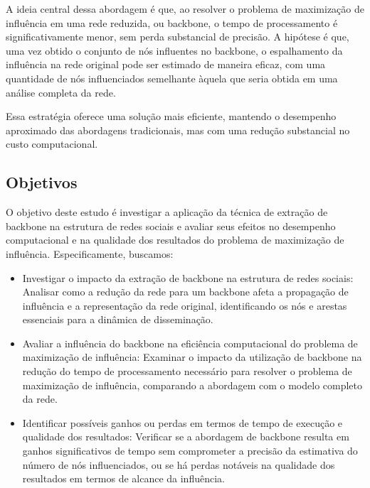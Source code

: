 \documentclass[12pt]{article}
\begin{document}
A ideia central dessa abordagem é que, ao resolver o problema de maximização de influência em uma rede reduzida, ou backbone, o tempo de processamento é significativamente menor, sem perda substancial de precisão. A hipótese é que, uma vez obtido o conjunto de nós influentes no backbone, o espalhamento da influência na rede original pode ser estimado de maneira eficaz, com uma quantidade de nós influenciados semelhante àquela que seria obtida em uma análise completa da rede.

Essa estratégia oferece uma solução mais eficiente, mantendo o desempenho aproximado das abordagens tradicionais, mas com uma redução substancial no custo computacional.

\subsection{Objetivos}

O objetivo deste estudo é investigar a aplicação da técnica de extração de backbone na estrutura de redes sociais e avaliar seus efeitos no desempenho computacional e na qualidade dos resultados do problema de maximização de influência. Especificamente, buscamos:
\begin{itemize}
    \item Investigar o impacto da extração de backbone na estrutura de redes sociais: Analisar como a redução da rede para um backbone afeta a propagação de influência e a representação da rede original, identificando os nós e arestas essenciais para a dinâmica de disseminação.
    \item Avaliar a influência do backbone na eficiência computacional do problema de maximização de influência: Examinar o impacto da utilização de backbone na redução do tempo de processamento necessário para resolver o problema de maximização de influência, comparando a abordagem com o modelo completo da rede.
    \item Identificar possíveis ganhos ou perdas em termos de tempo de execução e qualidade dos resultados: Verificar se a abordagem de backbone resulta em ganhos significativos de tempo sem comprometer a precisão da estimativa do número de nós influenciados, ou se há perdas notáveis na qualidade dos resultados em termos de alcance da influência. 
\end{itemize}

\end{document}
